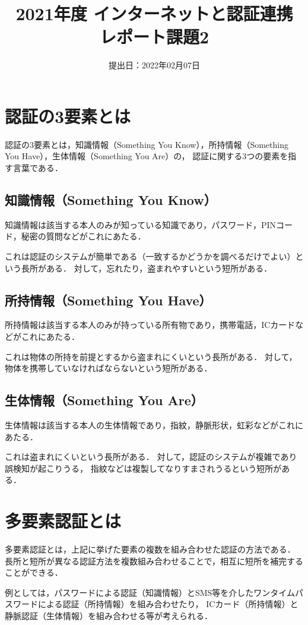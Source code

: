 \documentclass[lualatex, a4paper, ja=standard]{bxjsarticle}
\title{2021年度 インターネットと認証連携 レポート課題2}
\author{\directlua{tex.print(os.getenv("AUTHOR_NAME"))}}
\date{提出日：2022年02月07日}
\begin{document}
\maketitle

\section{認証の3要素とは}
認証の3要素とは，知識情報（Something You Know），所持情報（Something You Have），生体情報（Something You Are）の，
認証に関する3つの要素を指す言葉である\cite{about_3factors}．

\subsection{知識情報（Something You Know）}
知識情報は該当する本人のみが知っている知識であり，パスワード，PINコード，秘密の質問などがこれにあたる．

これは認証のシステムが簡単である（一致するかどうかを調べるだけでよい）という長所がある．
対して，忘れたり，盗まれやすいという短所がある．

\subsection{所持情報（Something You Have）}
所持情報は該当する本人のみが持っている所有物であり，携帯電話，ICカードなどがこれにあたる．

これは物体の所持を前提とするから盗まれにくいという長所がある．
対して，物体を携帯していなければならないという短所がある．

\subsection{生体情報（Something You Are）}
生体情報は該当する本人の生体情報であり，指紋，静脈形状，虹彩などがこれにあたる．

これは盗まれにくいという長所がある．
対して，認証のシステムが複雑であり誤検知が起こりうる，
指紋などは複製してなりすまされうるという短所がある．

\section{多要素認証とは}
多要素認証とは，上記に挙げた要素の複数を組み合わせた認証の方法である．
長所と短所が異なる認証方法を複数組み合わせることで，相互に短所を補完することができる．

例としては，パスワードによる認証（知識情報）とSMS等を介したワンタイムパスワードによる認証（所持情報）を組み合わせたり，
ICカード（所持情報）と静脈認証（生体情報）を組み合わせる等が考えられる．



\end{document}
